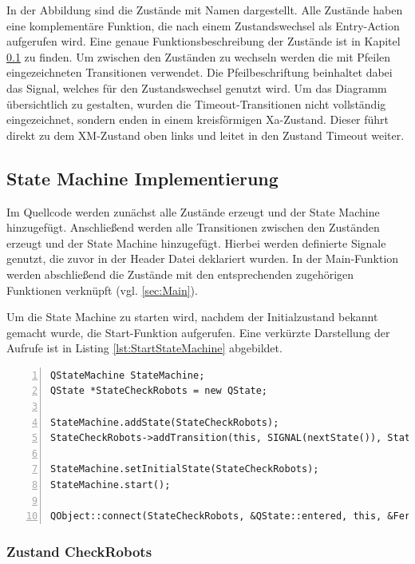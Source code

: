 In der Abbildung sind die Zustände mit Namen dargestellt. Alle Zustände haben eine komplementäre Funktion, die nach einem Zustandswechsel als Entry-Action aufgerufen wird. Eine genaue Funktionsbeschreibung der Zustände ist in Kapitel \ref{sec:StateMachineImplementierung} zu finden. Um zwischen den Zuständen zu wechseln werden die mit Pfeilen eingezeichneten Transitionen verwendet. Die Pfeilbeschriftung beinhaltet dabei das Signal, welches für den Zustandswechsel genutzt wird. Um das Diagramm übersichtlich zu gestalten, wurden die Timeout-Transitionen nicht vollständig eingezeichnet, sondern enden in einem kreisförmigen Xa-Zustand. Dieser führt direkt zu dem XM-Zustand oben links und leitet in den Zustand Timeout weiter. 

\subsection{State Machine Implementierung}
\label{sec:StateMachineImplementierung}

Im Quellcode werden zunächst alle Zustände erzeugt und der State Machine hinzugefügt. Anschließend werden alle Transitionen zwischen den Zuständen erzeugt und der State Machine hinzugefügt. Hierbei werden definierte Signale genutzt, die zuvor in der Header Datei deklariert wurden. In der Main-Funktion werden abschließend die Zustände mit den entsprechenden zugehörigen Funktionen verknüpft (vgl. \ref{sec:Main}). 

Um die State Machine zu starten wird, nachdem der Initialzustand bekannt gemacht wurde, die Start-Funktion aufgerufen. Eine verkürzte Darstellung der Aufrufe ist in Listing \ref{lst:StartStateMachine} abgebildet. 

\begin{lstlisting}[frame=single, breaklines=true, numbers=left, stepnumber=2, firstnumber=1, numberstyle = \tiny, caption=Start und Initialisierung der State Machine,label=lst:StartStateMachine]
QStateMachine StateMachine;
QState *StateCheckRobots = new QState;

StateMachine.addState(StateCheckRobots);
StateCheckRobots->addTransition(this, SIGNAL(nextState()), StateCheckAkku);

StateMachine.setInitialState(StateCheckRobots);
StateMachine.start();

QObject::connect(StateCheckRobots, &QState::entered, this, &Fertigungsplanung::CheckRobots);
\end{lstlisting}

\subsubsection{Zustand CheckRobots}

